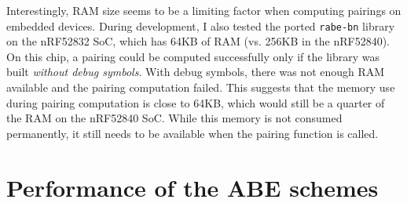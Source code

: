 

Interestingly, RAM size seems to be a limiting factor when computing pairings on embedded devices.
During development, I also tested the ported \texttt{rabe-bn} library on the nRF52832 SoC, which has 64KB of RAM (vs. 256KB in the nRF52840). 
On this chip, a pairing could be computed successfully only if the library was built \emph{without debug symbols}.
With debug symbols, there was not enough RAM available and the pairing computation failed.
This suggests that the memory use during pairing computation is close to 64KB, which would still be a quarter of the RAM on the nRF52840 SoC.
While this memory is not consumed permanently, it still needs to be available when the pairing function is called.

\section{Performance of the ABE schemes}

